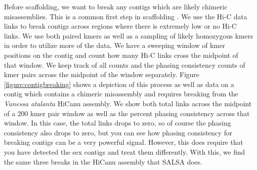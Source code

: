 {\par{
Before scaffolding, we want to break any contigs which are likely chimeric misassemblies. This is a common first step in scaffolding \cite{SALSA}\cite{scaffoldingreview}. We use the Hi-C data links to break contigs across regions where there is extremely low or no Hi-C links. We use both paired kmers as well as a sampling of likely homozygous kmers in order to utilize more of the data. We have a sweeping window of kmer positions on the contig and count how many Hi-C links cross the midpoint of that window. We keep track of all counts and the phasing consistency counts of kmer pairs across the midpoint of the window separately. Figure \ref{figure:contigbreaking} shows a depiction of this process as well as data on a contig which contains a chimeric misassembly and requires breaking from the \textit{Vanessa atalanta} HiCanu assembly. We show both total links across the midpoint of a 200 kmer pair window as well as the percent phasing consistency across that window. In this case, the total links drops to zero, so of course the phasing consistency also drops to zero, but you can see how phasing consistency for breaking contigs can be a very powerful signal. However, this does require that you have detected the sex contigs and treat them differently. With this, we find the same three breaks in the HiCanu assembly that SALSA does.
}

}
